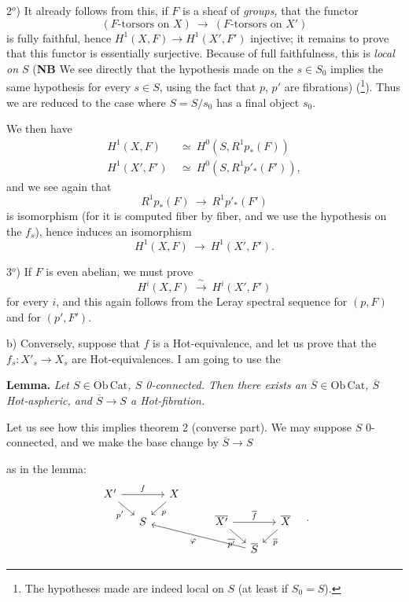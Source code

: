 \documentclass[11pt]{article}
\newcommand{\printedpage}[1]{\marginpar{\footnotesize p.~#1}}
\newcommand{\msp}[1]{\marginpar{\footnotesize [#1]}}
\newcommand{\Ob}{\mathrm{Ob}\,}
\newcommand{\Cat}{\mathrm{Cat}}
\begin{document}
2$^{o}$) It already follows from this, if $F$ is a sheaf of \textit{groups,} that the functor
\[
(F\text{-torsors on } X) \ \longrightarrow\ (F\text{-torsors on } X')
\]
is fully faithful, hence $H^1(X,F) \longrightarrow H^1(X',F')$ injective; it remains to prove that this functor is essentially surjective. Because of full faithfulness, this is \textit{local on $S$} (\textbf{NB} We see directly that the hypothesis made on the $s \in S_0$ implies the same hypothesis for every $s \in S$, using the fact that $p$, $p'$ are fibrations) (\footnote{The hypotheses made are indeed local on $S$ (at least if $S_0 = S$).}). Thus we are reduced to the case where $S = S/s_0$ has a final object $s_0$.

\printedpage{5}

\msp{page 133}

We then have
\[
\begin{aligned}
H^1(X,F) &\ \simeq\ H^0(S, R^1p_*(F)) \\
H^1(X',F') &\ \simeq\ H^0(S, R^1p'_*(F')),
\end{aligned}
\]
and we see again that
\[
R^1p_*(F) \ \longrightarrow\ R^1p'_*(F')
\]
is isomorphism (for it is computed fiber by fiber, and we use the hypothesis on the $f_s$), hence induces an isomorphism
\[
H^1(X,F) \ \longrightarrow\ H^1(X',F').
\]

3$^{o}$) If $F$ is even abelian, we must prove
\[
H^i(X,F) \ \xrightarrow{\ \sim\ }\ H^i(X',F')
\]
for every $i$, and this again follows from the Leray spectral sequence for $(p,F)$ and for $(p',F')$.

b) Conversely, suppose that $f$ is a Hot-equivalence, and let us prove that the $f_s : X'_s \longrightarrow X_s$ are Hot-equivalences. I am going to use the

\textbf{Lemma.} \textit{Let $S \in \Ob\Cat$, $S$ \textup{0}-connected. Then there exists an $\overline{S} \in \Ob\Cat$, $\overline{S}$ \textup{Hot}-aspheric, and $\overline{S} \longrightarrow S$ a \textup{Hot}-fibration.}

Let us see how this implies theorem 2 (converse part). We may suppose $S$ 0-connected, and we make the base change by $\overline{S} \longrightarrow S$

\msp{page 134}

as in the lemma:
\[
\begin{tikzcd}[column sep=small, row sep=small]
X' \arrow[rr, "f"] \arrow[dr, "p'"'] & & X \arrow[dl, "p"] & & & & \\
& S & & & \overline{X'} \arrow[rr, "\overline{f}"] \arrow[dr, "\overline{p'}"'] & & \overline{X} \arrow[dl, "\overline{p}"] \\
& & & & & \overline{S} \arrow[ullll, "\varphi"] &
\end{tikzcd}
\quad .
\]
\end{document}
